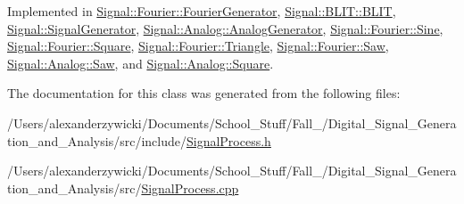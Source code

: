 Implemented in \hyperlink{classSignal_1_1Fourier_1_1FourierGenerator_acc6a3825eb4060269749a37ae29ee847}{Signal\+::\+Fourier\+::\+Fourier\+Generator}, \hyperlink{classSignal_1_1BLIT_1_1BLIT_a2f0ee604ed0e67557aa9f7e7f50d80ec}{Signal\+::\+B\+L\+I\+T\+::\+B\+L\+I\+T}, \hyperlink{classSignal_1_1SignalGenerator_a126d52dd9b6b14d33efc624e2c89284e}{Signal\+::\+Signal\+Generator}, \hyperlink{classSignal_1_1Analog_1_1AnalogGenerator_a8aa38b6c3f259b62b293f235cf1cc906}{Signal\+::\+Analog\+::\+Analog\+Generator}, \hyperlink{classSignal_1_1Fourier_1_1Sine_a5d951e5fbfc77354bddab9dfedea008f}{Signal\+::\+Fourier\+::\+Sine}, \hyperlink{classSignal_1_1Fourier_1_1Square_a7aacafda4427b996b56ad6764ea09177}{Signal\+::\+Fourier\+::\+Square}, \hyperlink{classSignal_1_1Fourier_1_1Triangle_a0c6ab725c3c74af5f1bfa8387b1bd3d3}{Signal\+::\+Fourier\+::\+Triangle}, \hyperlink{classSignal_1_1Fourier_1_1Saw_acef099db2217902d7157e5b93f658363}{Signal\+::\+Fourier\+::\+Saw}, \hyperlink{classSignal_1_1Analog_1_1Saw_aafc49f02333a62a110cb3edb6b1df3a7}{Signal\+::\+Analog\+::\+Saw}, and \hyperlink{classSignal_1_1Analog_1_1Square_a90961bdcef8e53e281088837553d5221}{Signal\+::\+Analog\+::\+Square}.



The documentation for this class was generated from the following files\+:\begin{DoxyCompactItemize}
\item 
/\+Users/alexanderzywicki/\+Documents/\+School\+\_\+\+Stuff/\+Fall\+\_/\+Digital\+\_\+\+Signal\+\_\+\+Generation\+\_\+and\+\_\+\+Analysis/src/include/\hyperlink{SignalProcess_8h}{Signal\+Process.\+h}\item 
/\+Users/alexanderzywicki/\+Documents/\+School\+\_\+\+Stuff/\+Fall\+\_/\+Digital\+\_\+\+Signal\+\_\+\+Generation\+\_\+and\+\_\+\+Analysis/src/\hyperlink{SignalProcess_8cpp}{Signal\+Process.\+cpp}\end{DoxyCompactItemize}
